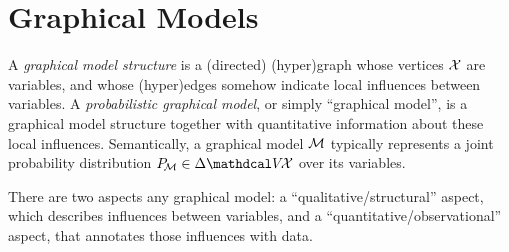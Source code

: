 



\section{Graphical Models}

A \emph{graphical model structure}
is a (directed) (hyper)graph whose vertices $\mathcal X$ are variables, and whose (hyper)edges 
somehow
indicate local influences between variables.
A \emph{probabilistic graphical model},
or simply  ``graphical model'',
is a
graphical model structure
together with quantitative information about these local influences.
Semantically,
a graphical model $\cal M$
typically
represents a joint probability distribution $\Pr_{\!\cal M}
 \in \Delta \V\!\X$ over its variables.

There are two aspects any graphical model: 
a ``qualitative/structural'' aspect, which describes influences between variables, and
a ``quantitative/observational'' aspect, 
    that annotates those influences with data.
    
